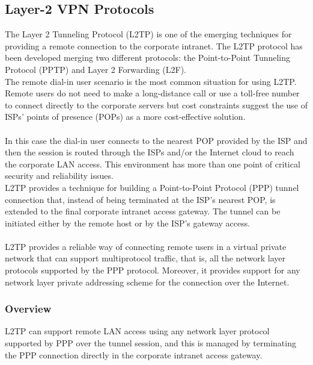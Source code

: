 \documentclass[10pt,a4paper]{article}
\begin{document}
\begin{itemize}
\begin{itemize}
\newpage

\part{Layer-2 VPN Protocols}

The Layer 2 Tunneling Protocol (L2TP) is one of the emerging techniques for
providing a remote connection to the corporate intranet. The L2TP protocol has
been developed merging two different protocols: the Point-to-Point Tunneling
Protocol (PPTP) and Layer 2 Forwarding (L2F).
\\
The remote dial-in user scenario is the most common situation for using L2TP.
Remote users do not need to make a long-distance call or use a toll-free number
to connect directly to the corporate servers but cost constraints suggest the use
of ISPs' points of presence (POPs) as a more cost-effective solution. 
\\
\\
In this case
the dial-in user connects to the nearest POP provided by the ISP and then the
session is routed through the ISPs and/or the Internet cloud to reach the
corporate LAN access. This environment has more than one point of critical
security and reliability issues.
\\
L2TP provides a technique for building a Point-to-Point Protocol (PPP) tunnel
connection that, instead of being terminated at the ISP's nearest POP, is
extended to the final corporate intranet access gateway. The tunnel can be
initiated either by the remote host or by the ISP's gateway access. 
\\
\\
L2TP provides
a reliable way of connecting remote users in a virtual private network that can
support multiprotocol traffic, that is, all the network layer protocols supported by
the PPP protocol. Moreover, it provides support for any network layer private
addressing scheme for the connection over the Internet.
\\
\section{Overview}
L2TP can support remote LAN access using any network layer protocol
supported by PPP over the tunnel session, and this is managed by terminating
the PPP connection directly in the corporate intranet access gateway.


\end{itemize}
\end{itemize}
\end{document}
